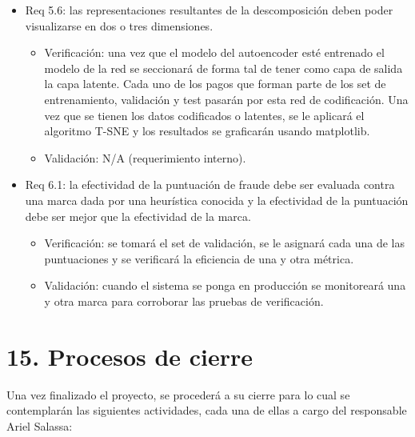 \documentclass[
11pt, %
]{charter}
\begin{document}
\begin{itemize}
\item Req 5.6: las representaciones resultantes de la descomposición deben poder visualizarse en dos o tres dimensiones.
\begin{itemize}
	\item Verificación: una vez que el modelo del autoencoder esté entrenado el modelo de la red se seccionará de forma tal de tener como capa de salida la capa latente. Cada uno de los pagos que forman parte de los set de entrenamiento, validación y test pasarán por esta red de codificación. Una vez que se tienen los datos codificados o latentes, se le aplicará el algoritmo T-SNE y los resultados se graficarán usando matplotlib. 
	\item Validación: N/A (requerimiento interno).
\end{itemize}

\item Req 6.1: la efectividad de la puntuación de fraude debe ser evaluada contra una marca dada por una heurística conocida y la efectividad de la puntuación debe ser mejor que la efectividad de la marca.
\begin{itemize}
	\item Verificación: se tomará el set de validación, se le asignará cada una de las puntuaciones y se verificará la eficiencia de una y otra métrica.
	\item Validación: cuando el sistema se ponga en producción se monitoreará una y otra marca para corroborar las pruebas de verificación.
\end{itemize}

\end{itemize}

\section{15. Procesos de cierre}    
\label{sec:cierre}

Una vez finalizado el proyecto, se procederá a su cierre para lo cual se contemplarán las siguientes actividades, cada una de ellas a cargo del responsable Ariel Salassa:
\end{document}
